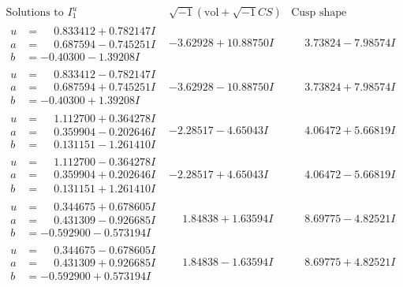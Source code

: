 \documentclass[1p]{elsarticle_modified}
\theoremstyle{definition}
\newcommand{\I}{\sqrt{-1}}
\begin{document}
$$\begin{array}{c|c|c}  
\text{Solutions to }I^u_{1}& \I (\text{vol} + \sqrt{-1}CS) & \text{Cusp shape}\\
 \hline 
\begin{aligned}
u &= \phantom{-}0.833412 + 0.782147 I \\
a &= \phantom{-}0.687594 - 0.745251 I \\
b &= -0.40300 - 1.39208 I\end{aligned}
 & -3.62928 + 10.88750 I & \phantom{-}3.73824 - 7.98574 I \\ \hline\begin{aligned}
u &= \phantom{-}0.833412 - 0.782147 I \\
a &= \phantom{-}0.687594 + 0.745251 I \\
b &= -0.40300 + 1.39208 I\end{aligned}
 & -3.62928 - 10.88750 I & \phantom{-}3.73824 + 7.98574 I \\ \hline\begin{aligned}
u &= \phantom{-}1.112700 + 0.364278 I \\
a &= \phantom{-}0.359904 - 0.202646 I \\
b &= \phantom{-}0.131151 - 1.261410 I\end{aligned}
 & -2.28517 - 4.65043 I & \phantom{-}4.06472 + 5.66819 I \\ \hline\begin{aligned}
u &= \phantom{-}1.112700 - 0.364278 I \\
a &= \phantom{-}0.359904 + 0.202646 I \\
b &= \phantom{-}0.131151 + 1.261410 I\end{aligned}
 & -2.28517 + 4.65043 I & \phantom{-}4.06472 - 5.66819 I \\ \hline\begin{aligned}
u &= \phantom{-}0.344675 + 0.678605 I \\
a &= \phantom{-}0.431309 - 0.926685 I \\
b &= -0.592900 - 0.573194 I\end{aligned}
 & \phantom{-}1.84838 + 1.63594 I & \phantom{-}8.69775 - 4.82521 I \\ \hline\begin{aligned}
u &= \phantom{-}0.344675 - 0.678605 I \\
a &= \phantom{-}0.431309 + 0.926685 I \\
b &= -0.592900 + 0.573194 I\end{aligned}
 & \phantom{-}1.84838 - 1.63594 I & \phantom{-}8.69775 + 4.82521 I \\ \hline\begin{aligned}

\end{aligned}
\end{array}$$
\end{document}
